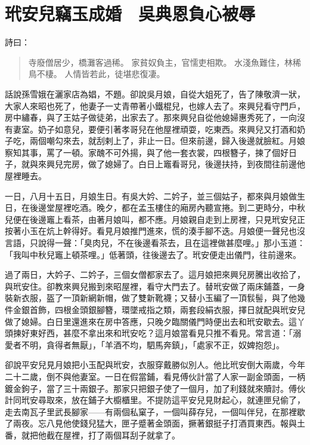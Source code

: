 
\chapter{玳安兒竊玉成婚　吳典恩負心被辱}

詩曰：
\begin{quote}
寺廢僧居少，橋灘客過稀。
家貧奴負主，官懦吏相欺。
水淺魚難住，林稀鳥不棲。
人情皆若此，徒堪悲復凄。
\end{quote}

話說孫雪娥在灑家店為娼，不題。卻說吳月娘，自從大姐死了，告了陳敬濟一狀，大家人來昭也死了，他妻子一丈青帶著小鐵棍兒，也嫁人去了。來興兒看守門戶，房中繡春，與了王姑子做徒弟，出家去了。那來興兒自從他媳婦惠秀死了，一向沒有妻室。奶子如意兒，要便引著孝哥兒在他屋裡頑耍，吃東西。來興兒又打酒和奶子吃，兩個嘲勾來去，就刮剌上了，非止一日。但來前邊，歸入後邊就臉紅。月娘察知其事，罵了一頓。家醜不可外揚，與了他一套衣裳，四根簪子，揀了個好日子，就與來興兒完房，做了媳婦了。白日上竈看哥兒，後邊扶持，到夜間往前邊他屋裡睡去。

一日，八月十五日，月娘生日。有吳大妗、二妗子，並三個姑子，都來與月娘做生日，在後邊堂屋裡吃酒。晚夕，都在孟玉樓住的廂房內聽宣捲。到二更時分，中秋兒便在後邊竈上看茶，由著月娘叫，都不應。月娘親自走到上房裡，只見玳安兒正按著小玉在炕上幹得好。看見月娘推門進來，慌的湊手腳不迭。月娘便一聲兒也沒言語，只說得一聲：「臭肉兒，不在後邊看茶去，且在這裡做甚麼哩。」那小玉道：「我叫中秋兒竈上頓茶哩。」低著頭，往後邊去了。玳安便走出儀門，往前邊來。

過了兩日，大妗子、二妗子，三個女僧都家去了。這月娘把來興兒房騰出收拾了，與玳安住。卻教來興兒搬到來昭屋裡，看守大門去了。替玳安做了兩床鋪蓋，一身裝新衣服，盔了一頂新網新帽，做了雙新靴襪；又替小玉編了一頂䯼髻，與了他幾件金銀首飾，四根金頭銀腳簪，環墜戒指之類，兩套段絹衣服，擇日就配與玳安兒做了媳婦。白日里還進來在房中答應，只晚夕臨關儀門時便出去和玳安歇去。這丫頭揀好東好西，甚麼不拿出來和玳安吃？這月娘當看見只推不看見。常言道：「溺愛者不明，貪得者無厭」，「羊酒不均，駟馬奔鎮」，「處家不正，奴婢抱怨」。

卻說平安兒見月娘把小玉配與玳安，衣服穿戴勝似別人。他比玳安倒大兩歲，今年二十二歲，倒不與他妻室。一日在假當鋪，看見傅伙計當了人家一副金頭面，一柄鍍金鉤子，當了三十兩銀子。那家只把銀子使了一個月，加了利錢就來贖討。傅伙計同玳安尋取來，放在鋪子大櫥櫃里。不提防這平安兒見財起心，就連匣兒偷了，走去南瓦子里武長腳家——有兩個私窠子，一個叫薛存兒，一個叫伴兒，在那裡歇了兩夜。忘八見他使錢兒猛大，匣子蹙著金頭面，撅著銀挺子打酒買東西。報與土番，就把他截在屋裡，打了兩個耳刮子就拿了。

